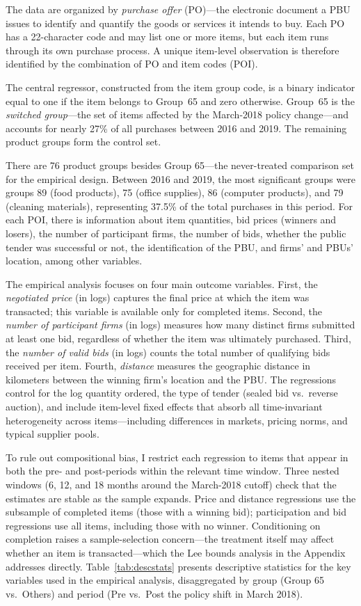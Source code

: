 The data are organized by \emph{purchase offer} (PO)---the electronic document a PBU issues to identify and quantify the goods or services it intends to buy. Each PO has a 22-character code and may list one or more items, but each item runs through its own purchase process. A unique item-level observation is therefore identified by the combination of PO and item codes (POI).

The central regressor, constructed from the item group code, is a binary indicator equal to one if the item belongs to Group~65 and zero otherwise. Group~65 is the \emph{switched group}---the set of items affected by the March-2018 policy change---and accounts for nearly 27\% of all purchases between 2016 and 2019. The remaining product groups form the control set.

There are 76 product groups besides Group 65---the never-treated comparison set for the empirical design. Between 2016 and 2019, the most significant groups were groups 89 (food products), 75 (office supplies), 86 (computer products), and 79 (cleaning materials), representing 37.5\% of the total purchases in this period. For each POI, there is information about item quantities, bid prices (winners and losers), the number of participant firms, the number of bids, whether the public tender was successful or not, the identification of the PBU, and firms’ and PBUs’ location, among other variables.

The empirical analysis focuses on four main outcome variables. First, the \emph{negotiated price} (in logs) captures the final price at which the item was transacted; this variable is available only for completed items. Second, the \emph{number of participant firms} (in logs) measures how many distinct firms submitted at least one bid, regardless of whether the item was ultimately purchased. Third, the \emph{number of valid bids} (in logs) counts the total number of qualifying bids received per item. Fourth, \emph{distance} measures the geographic distance in kilometers between the winning firm’s location and the PBU. The regressions control for the log quantity ordered, the type of tender (sealed bid vs.\ reverse auction), and include item-level fixed effects that absorb all time-invariant heterogeneity across items---including differences in markets, pricing norms, and typical supplier pools.

To rule out compositional bias, I restrict each regression to items that appear in both the pre- and post-periods within the relevant time window. Three nested windows (6, 12, and 18 months around the March-2018 cutoff) check that the estimates are stable as the sample expands. Price and distance regressions use the subsample of completed items (those with a winning bid); participation and bid regressions use all items, including those with no winner. Conditioning on completion raises a sample-selection concern---the treatment itself may affect whether an item is transacted---which the Lee bounds analysis in the Appendix addresses directly. Table~\ref{tab:descstats} presents descriptive statistics for the key variables used in the empirical analysis, disaggregated by group (Group 65 vs.\ Others) and period (Pre vs.\ Post the policy shift in March 2018).

